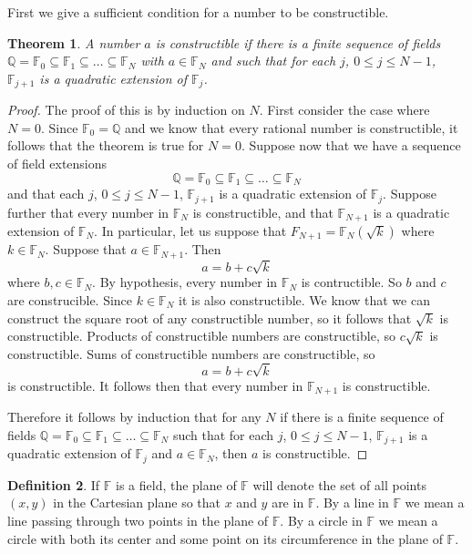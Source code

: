 \documentclass[11pt]{article}
\renewcommand\subset\subseteq
\newtheorem{theorem}{Theorem}[section]
\theoremstyle{definition}
\newtheorem{definition}[theorem]{Definition}
\begin{document}
First we give a sufficient condition for a number to be constructible.

\begin{theorem}
  A number $a$ is constructible if there is a finite sequence of fields $\mathbb{Q} = \mathbb{F}_0 \subset \mathbb{F}_1\subset \dots \subset \mathbb{F}_N$ with
  $a\in\mathbb{F}_N$ and such that for each $j$, $0\leq j \leq N-1$, $\mathbb{F}_{j+1}$ is a quadratic extension of $\mathbb{F}_j$.
  \label{theorem: constructible if in sequence of quadratic extensions}
\end{theorem}
\begin{proof}
  The proof of this is by induction on $N$. First consider the case where $N=0$. Since $\mathbb{F}_0=\mathbb{Q}$ and we know that every rational number
  is constructible, it follows that the theorem is true for $N=0$. Suppose now that we have a sequence of field extensions
  \[ \mathbb{Q} = \mathbb{F}_0 \subset \mathbb{F}_1\subset \dots \subset \mathbb{F}_N \]
  and that each $j$, $0\leq j \leq N-1$, $\mathbb{F}_{j+1}$ is a quadratic extension of $\mathbb{F}_j$. Suppose further that
  every number in $\mathbb{F}_N$ is constructible, and that $\mathbb{F}_{N+1}$ is a quadratic extension of $\mathbb{F}_N$. In particular, let us suppose that
  $F_{N+1}=\mathbb{F}_N(\sqrt{k})$ where $k \in \mathbb{F}_N$. Suppose that $a \in \mathbb{F}_{N+1}$. Then 
  \[ a = b + c\sqrt{k}\]
  where $b,c\in\mathbb{F}_N$. By hypothesis, every number in $\mathbb{F}_N$ is contructible. So $b$ and $c$ are construcible. Since $k\in\mathbb{F}_N$ it is also
  constructible. We know that we can construct the square root of any constructible number, so it follows that $\sqrt{k}$ is constructible. Products of
  constructible numbers are constructible, so $c\sqrt{k}$ is constructible. Sums of constructible numbers are constructible, so 
  \[ a = b + c\sqrt{k} \]
  is constructible. It follows then that every number in $\mathbb{F}_{N+1}$ is constructible. 
  
  Therefore it follows by induction that for any $N$ if there is a finite sequence of fields 
  $\mathbb{Q} = \mathbb{F}_0 \subset \mathbb{F}_1\subset \dots \subset \mathbb{F}_N$ 
  such that for each $j$, $0\leq j \leq N-1$, $\mathbb{F}_{j+1}$ is a quadratic extension of $\mathbb{F}_j$ and $a\in\mathbb{F}_N$, then $a$ is constructible. 
\end{proof}

\begin{definition}
  If $\mathbb{F}$ is a field, the plane of $\mathbb{F}$ will denote the set of all points $(x,y)$ in the Cartesian plane so that $x$ and $y$ are 
  in $\mathbb{F}$. By a line in $\mathbb{F}$ we mean a line passing through two points in the plane of $\mathbb{F}$. By a circle in $\mathbb{F}$ we 
  mean a circle with both its center and some point on its circumference in the plane of $\mathbb{F}$.
\end{definition}
\end{document}

